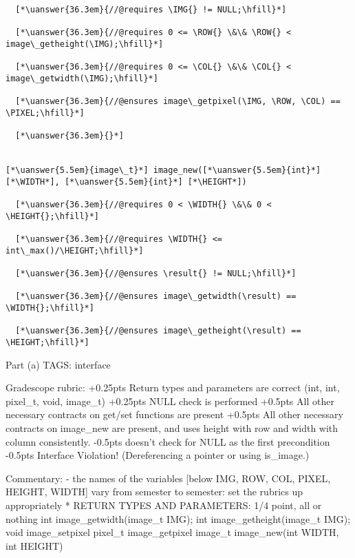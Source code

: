 \begin{parts}
\begin{framed}
\begin{lstlisting}
  [*\uanswer{36.3em}{//@requires \IMG{} != NULL;\hfill}*]

  [*\uanswer{36.3em}{//@requires 0 <= \ROW{} \&\& \ROW{} < image\_getheight(\IMG);\hfill}*]

  [*\uanswer{36.3em}{//@requires 0 <= \COL{} \&\& \COL{} < image\_getwidth(\IMG);\hfill}*]

  [*\uanswer{36.3em}{//@ensures image\_getpixel(\IMG, \ROW, \COL) == \PIXEL;\hfill}*]

  [*\uanswer{36.3em}{}*]


[*\uanswer{5.5em}{image\_t}*] image_new([*\uanswer{5.5em}{int}*] [*\WIDTH*], [*\uanswer{5.5em}{int}*] [*\HEIGHT*])

  [*\uanswer{36.3em}{//@requires 0 < \WIDTH{} \&\& 0 < \HEIGHT{};\hfill}*]

  [*\uanswer{36.3em}{//@requires \WIDTH{} <= int\_max()/\HEIGHT;\hfill}*]

  [*\uanswer{36.3em}{//@ensures \result{} != NULL;\hfill}*]

  [*\uanswer{36.3em}{//@ensures image\_getwidth(\result) == \WIDTH{};\hfill}*]

  [*\uanswer{36.3em}{//@ensures image\_getheight(\result) == \HEIGHT;\hfill}*]
\end{lstlisting}
\end{framed}

\RUBRIC
Part (a)
TAGS: interface

Gradescope rubric:
+0.25pts Return types and parameters are correct (int, int, pixel_t, void, image_t)
+0.25pts NULL check is performed
+0.5pts All other necessary contracts on get/set functions are present
+0.5pts All other necessary contracts on image_new are present, and uses height with row and width with column consistently.
-0.5pts doesn't check for NULL as the first precondition
-0.5pts Interface Violation! (Dereferencing a pointer or using is_image.)

Commentary:
- the names of the variables [below IMG, ROW, COL, PIXEL, HEIGHT, WIDTH]
  vary from semester to semester: set the rubrics up appropriately
 * RETURN TYPES AND PARAMETERS: 1/4 point, all or nothing
    int image_getwidth(image_t IMG);
    int image_getheight(image_t IMG);
    void image_setpixel
    pixel_t image_getpixel
    image_t image_new(int WIDTH, int HEIGHT)


\end{parts}
